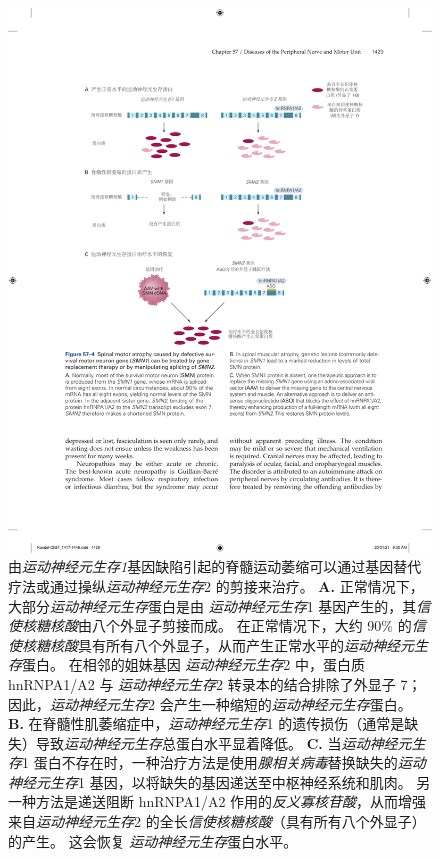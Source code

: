 \begin{figure}[htbp]
	\centering
	\includegraphics[width=1.0\linewidth]{chap57/fig_57_4}
	\caption{由\textit{运动神经元生存1}基因缺陷引起的脊髓运动萎缩可以通过基因替代疗法或通过操纵\textit{运动神经元生存}2 的剪接来治疗。
		\textbf{A.} 正常情况下，大部分\textit{运动神经元生存}蛋白是由 \textit{运动神经元生存}1 基因产生的，其\textit{信使核糖核酸}由八个外显子剪接而成。
		在正常情况下，大约 90\% 的\textit{信使核糖核酸}具有所有八个外显子，从而产生正常水平的\textit{运动神经元生存}蛋白。
		在相邻的姐妹基因 \textit{运动神经元生存}2 中，蛋白质 hnRNPA1/A2 与 \textit{运动神经元生存}2 转录本的结合排除了外显子 7；
		因此，\textit{运动神经元生存}2 会产生一种缩短的\textit{运动神经元生存}蛋白。
		\textbf{B.} 在脊髓性肌萎缩症中，\textit{运动神经元生存}1 的遗传损伤（通常是缺失）导致\textit{运动神经元生存}总蛋白水平显着降低。
		\textbf{C.} 当\textit{运动神经元生存}1 蛋白不存在时，一种治疗方法是使用\textit{腺相关病毒}替换缺失的\textit{运动神经元生存}1 基因，以将缺失的基因递送至中枢神经系统和肌肉。
		另一种方法是递送阻断 hnRNPA1/A2 作用的\textit{反义寡核苷酸}，从而增强来自\textit{运动神经元生存}2 的全长\textit{信使核糖核酸}（具有所有八个外显子）的产生。
		这会恢复 \textit{运动神经元生存}蛋白水平。}
	\label{fig:57_4}
\end{figure}


